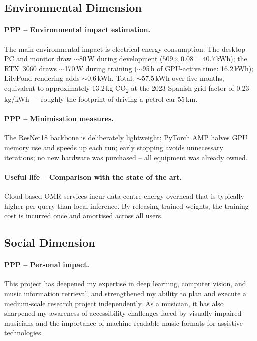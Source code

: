 \documentclass[11pt, a4paper]{article}
\begin{document}
\subsection{Environmental Dimension}
\label{sec:env-sustainability}

\paragraph{PPP -- Environmental impact estimation.}
The main environmental impact is electrical energy consumption. The desktop PC and monitor draw $\sim$80\,W during development ($509 \times 0.08 = 40.7$\,kWh); the RTX~3060 draws $\sim$170\,W during training ($\sim$95\,h of GPU-active time: 16.2\,kWh); LilyPond rendering adds $\sim$0.6\,kWh. Total: $\sim$57.5\,kWh over five months, equivalent to approximately 13.2\,kg CO\textsubscript{2} at the 2023 Spanish grid factor of 0.23\,kg/kWh~\cite{reeInformeSistemaElectrico2024,mitecoFactorEmision2025} -- roughly the footprint of driving a petrol car 55\,km.

\paragraph{PPP -- Minimisation measures.}
The ResNet18 backbone is deliberately lightweight; PyTorch AMP halves GPU memory use and speeds up each run; early stopping avoids unnecessary iterations; no new hardware was purchased -- all equipment was already owned.

\paragraph{Useful life -- Comparison with the state of the art.}
Cloud-based OMR services incur data-centre energy overhead that is typically higher per query than local inference. By releasing trained weights, the training cost is incurred once and amortised across all users.

\subsection{Social Dimension}
\label{sec:social-sustainability}

\paragraph{PPP -- Personal impact.}
This project has deepened my expertise in deep learning, computer vision, and music information retrieval, and strengthened my ability to plan and execute a medium-scale research project independently. As a musician, it has also sharpened my awareness of accessibility challenges faced by visually impaired musicians and the importance of machine-readable music formats for assistive technologies.
\end{document}
